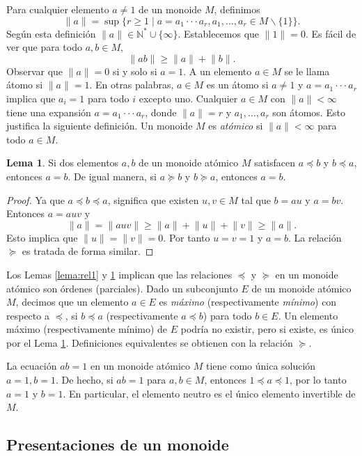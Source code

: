 \documentclass[12pt]{book}
\theoremstyle{definition}
\newtheorem{lema}{Lema}[section]
\providecommand{\norm}[1]{\lVert#1\rVert}
\begin{document}
Para cualquier elemento $a\neq 1$ de un monoide $M$, definimos
$$\norm{a}=\sup\{r\geq 1\mid a=a_1\cdot\cdot\cdot a_r,a_1,...,a_r\in M\backslash \{1\}\}.$$
Según esta definición $\norm{a}\in \mathbb{N}^*\cup\{\infty\}$. Establecemos que $\norm{1}=0$. Es fácil de ver que para todo $a,b\in M$,
$$\norm{ab}\geq\norm{a}+\norm{b}.$$
Observar que $\norm{a}=0$ si y solo si $a=1$. A un elemento $a\in M$ se le llama átomo si $\norm{a}=1$. En otras palabras, $a\in M$ es un átomo si $a\neq 1$ y $a=a_1\cdot\cdot\cdot a_r$ implica que $a_i=1$ para todo $i$ excepto uno. Cualquier $a\in M$ con $\norm{a} < \infty$ tiene una expansión $a=a_1\cdot\cdot\cdot a_r$, donde $\norm{a}=r$ y $a_1,...,a_r$ son átomos. Esto justifica la siguiente definición. Un monoide $M$ es \textit{atómico} si $\norm{a} < \infty$ para todo $a\in M$.

\begin{lema}
Si dos elementos $a,b$ de un monoide atómico $M$ satisfacen $a\preceq b$ y $b\preceq a$, entonces $a=b$. De igual manera, si $a\succeq b$ y $b\succeq a$, entonces $a=b$.
\label{lema:rel2}
\end{lema}

\begin{proof} Ya que $a\preceq b\preceq a$, significa que existen $u,v\in M$ tal que $b=au$ y $a=bv$. Entonces $a=auv$ y
$$\norm{a}=\norm{auv}\geq \norm{a}+\norm{u}+\norm{v}\geq \norm{a}.$$
Esto implica que $\norm{u}=\norm{v}=0$. Por tanto $u=v=1$ y $a=b$. La relación $\succeq$ es tratada de forma similar.
\end{proof}
Los Lemas \ref{lema:rel1} y \ref{lema:rel2} implican que las relaciones $\preceq$ y $\succeq$ en un monoide atómico son órdenes (parciales). Dado un subconjunto $E$ de un monoide atómico $M$, decimos que un elemento $a\in E$ es \textit{máximo} (respectivamente \textit{mínimo}) con respecto a $\preceq$, si $b\preceq a$ (respectivamente $a\preceq b$) para todo $b\in E$. Un elemento máximo (respectivamente mínimo) de $E$ podría no existir, pero si existe, es único por el Lema \ref{lema:rel2}. Definiciones equivalentes se obtienen con la relación $\succeq$.

La ecuación $ab=1$ en un monoide atómico $M$ tiene como única solución $a=1,b=1$. De hecho, si $ab=1$ para $a,b\in M$, entonces $1\preceq a \preceq 1$, por lo tanto $a=1$ y $b=1$. En particular, el elemento neutro es el único elemento invertible de $M$.

\subsection{Presentaciones de un monoide}
\end{document}
